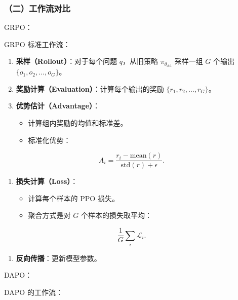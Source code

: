 \hypertarget{ux4e8cux5de5ux4f5cux6d41ux5bf9ux6bd4}{%
\subsubsection{（二）工作流对比}\label{ux4e8cux5de5ux4f5cux6d41ux5bf9ux6bd4}}

GRPO：

GRPO 标准工作流：

\begin{enumerate}
\def\labelenumi{\arabic{enumi}.}
\tightlist
\item
  \textbf{采样（Rollout）}：对于每个问题 \(q\)，从旧策略 \(\pi_{\theta_{\mathrm{old}}}\) 采样一组 \(G\) 个输出 \(\{o_1,o_2,\ldots,o_G\}\)。
\item
  \textbf{奖励计算（Evaluation）}：计算每个输出的奖励 \(\{r_1,r_2,\ldots,r_G\}\)。
\item
  \textbf{优势估计（Advantage）}：

  \begin{itemize}
  \tightlist
  \item
    计算组内奖励的均值和标准差。
  \item
    标准化优势：
  \end{itemize}
\end{enumerate}

\[
A_i
=
\frac{r_i-\mathrm{mean}(r)}
{\mathrm{std}(r)+\epsilon}.
\]

\begin{enumerate}
\def\labelenumi{\arabic{enumi}.}
\setcounter{enumi}{3}
\tightlist
\item
  \textbf{损失计算（Loss）}：

  \begin{itemize}
  \tightlist
  \item
    计算每个样本的 PPO 损失。
  \item
    聚合方式是对 \(G\) 个样本的损失取平均：
  \end{itemize}
\end{enumerate}

\[
\frac{1}{G}\sum_i \mathcal{L}_i.
\]

\begin{enumerate}
\def\labelenumi{\arabic{enumi}.}
\setcounter{enumi}{4}
\tightlist
\item
  \textbf{反向传播}：更新模型参数。
\end{enumerate}

DAPO：

DAPO 的工作流：

